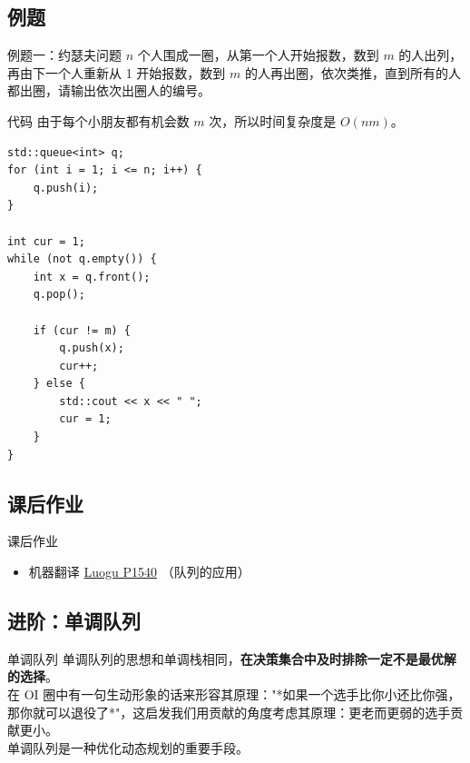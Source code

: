 \documentclass{beamer}
\begin{document}
\subsection{例题}
\begin{frame}{例题一：约瑟夫问题}
    $n$ 个人围成一圈，从第一个人开始报数，数到 $m$ 的人出列，再由下一个人重新从 1 开始报数，数到 $m$ 的人再出圈，依次类推，直到所有的人都出圈，请输出依次出圈人的编号。
\end{frame}

\begin{frame}[fragile]{代码}
    由于每个小朋友都有机会数 $m$ 次，所以时间复杂度是 $O(nm)$。

    \begin{verbatim}
std::queue<int> q;
for (int i = 1; i <= n; i++) {
    q.push(i);
}

int cur = 1;
while (not q.empty()) {
    int x = q.front();
    q.pop();

    if (cur != m) {
        q.push(x);
        cur++;
    } else {
        std::cout << x << " ";
        cur = 1;
    }
}
    \end{verbatim}
\end{frame}

\subsection{课后作业}
\begin{frame}{课后作业}
    \begin{itemize}
        \item {} 机器翻译 \href{https://www.luogu.com.cn/problem/P1540}{Luogu P1540} （队列的应用）
    \end{itemize}
\end{frame}

\subsection{进阶：单调队列}
\begin{frame}{单调队列}
    单调队列的思想和单调栈相同，\textbf{在决策集合中及时排除一定不是最优解的选择}。\\

    在 OI 圈中有一句生动形象的话来形容其原理："*如果一个选手比你小还比你强，那你就可以退役了*"，这启发我们用贡献的角度考虑其原理：更老而更弱的选手贡献更小。\\

    单调队列是一种优化动态规划的重要手段。
\end{frame}
\end{document}
